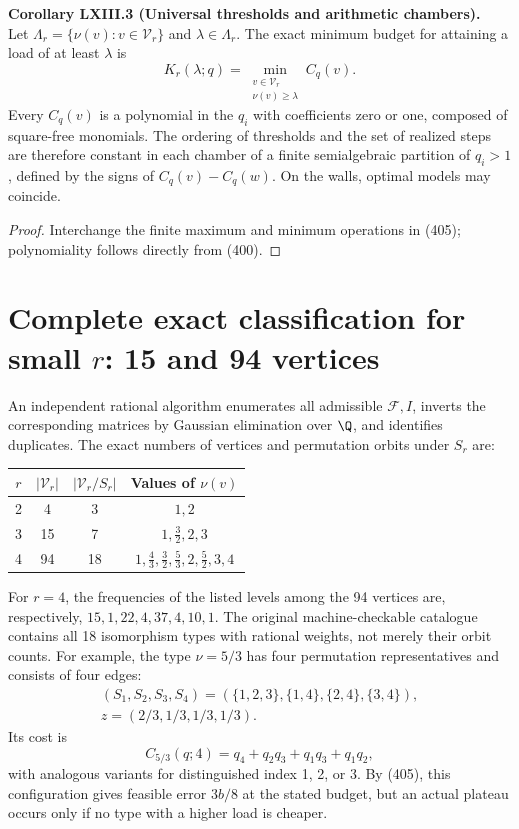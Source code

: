 \documentclass[11pt,a4paper,oneside]{book}
\newcommand{\statement}[3]{\par\medskip\noindent\textbf{#1 #2 (#3).}\ }
\begin{document}
\statement{Corollary}{LXIII.3}{Universal thresholds and arithmetic chambers}
Let $\Lambda_r=\{\nu(v):v\in\mathcal V_r\}$ and $\lambda\in\Lambda_r$. The exact minimum budget for attaining a load of at least $\lambda$ is
\begin{equation}
K_r(\lambda;q)=\min_{\substack{v\in\mathcal V_r\\\nu(v)\ge\lambda}}C_q(v).\tag{406}
\end{equation}
Every $C_q(v)$ is a polynomial in the $q_i$ with coefficients zero or one, composed of square-free monomials. The ordering of thresholds and the set of realized steps are therefore constant in each chamber of a finite semialgebraic partition of $q_i>1$, defined by the signs of $C_q(v)-C_q(w)$. On the walls, optimal models may coincide.
\begin{proof}
Interchange the finite maximum and minimum operations in (405); polynomiality follows directly from (400).
\end{proof}

\section{Complete exact classification for small $r$: 15 and 94 vertices}
An independent rational algorithm enumerates all admissible $\mathcal F,I$, inverts the corresponding matrices by Gaussian elimination over $\Q$, and identifies duplicates. The exact numbers of vertices and permutation orbits under $S_r$ are:
\begin{center}
\begin{tabular}{cccc}\toprule
$r$&$|\mathcal V_r|$&$|\mathcal V_r/S_r|$&Values of $\nu(v)$\\\midrule
2&4&3&$1,2$\\
3&15&7&$1,\frac32,2,3$\\
4&94&18&$1,\frac43,\frac32,\frac53,2,\frac52,3,4$\\\bottomrule
\end{tabular}
\end{center}
For $r=4$, the frequencies of the listed levels among the 94 vertices are, respectively, $15,1,22,4,37,4,10,1$. The original machine-checkable catalogue contains all 18 isomorphism types with rational weights, not merely their orbit counts. For example, the type $\nu=5/3$ has four permutation representatives and consists of four edges:
\begin{equation}
\begin{gathered}
(S_1,S_2,S_3,S_4)=(\{1,2,3\},\{1,4\},\{2,4\},\{3,4\}),\\
z=(2/3,1/3,1/3,1/3).
\end{gathered}\tag{407}
\end{equation}
Its cost is
\begin{equation}
C_{5/3}(q;4)=q_4+q_2q_3+q_1q_3+q_1q_2,\tag{408}
\end{equation}
with analogous variants for distinguished index 1, 2, or 3. By (405), this configuration gives feasible error $3b/8$ at the stated budget, but an actual plateau occurs only if no type with a higher load is cheaper.
\end{document}
